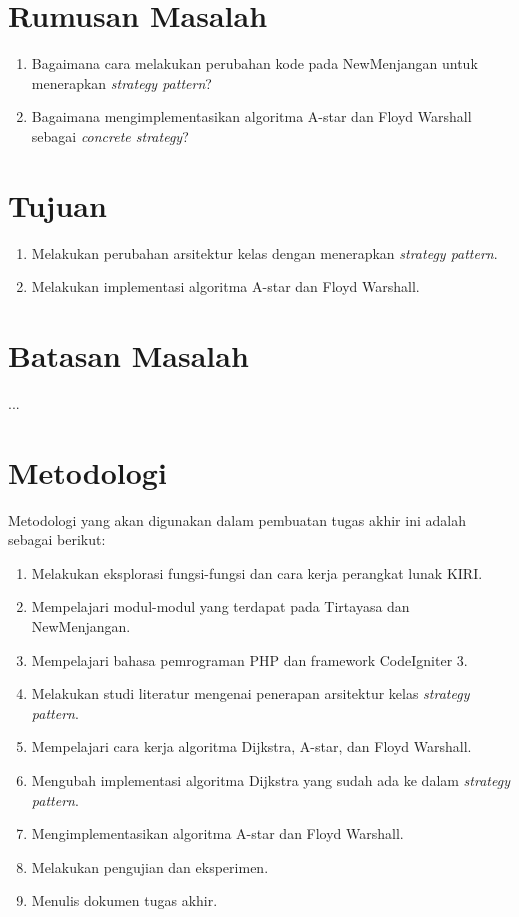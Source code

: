 \section{Rumusan Masalah}
\label{sec:rumusan}
	\begin{enumerate}
                \item Bagaimana cara melakukan perubahan kode pada NewMenjangan untuk menerapkan \textit{strategy pattern}?
                \item Bagaimana mengimplementasikan algoritma A-star dan Floyd Warshall sebagai \textit{concrete strategy}?
	\end{enumerate}
\newpage
\section{Tujuan}
\label{sec:tujuan}
	\begin{enumerate}
                \item Melakukan perubahan arsitektur kelas dengan menerapkan \textit{strategy pattern}.
                \item Melakukan implementasi algoritma A-star dan Floyd Warshall.
            \end{enumerate}

\section{Batasan Masalah}
\label{sec:batasan}
...

\section{Metodologi}
\label{sec:metlit}
Metodologi yang akan digunakan dalam pembuatan tugas akhir ini adalah sebagai berikut:
	\begin{enumerate}
		\item Melakukan eksplorasi fungsi-fungsi dan cara kerja perangkat lunak KIRI.
		\item Mempelajari modul-modul yang terdapat pada Tirtayasa dan NewMenjangan.
		\item Mempelajari bahasa pemrograman PHP dan framework CodeIgniter 3.
		\item Melakukan studi literatur mengenai penerapan arsitektur kelas \textit{strategy pattern}.
    		\item Mempelajari cara kerja algoritma Dijkstra, A-star, dan Floyd Warshall.
    		\item Mengubah implementasi algoritma Dijkstra yang sudah ada ke dalam \textit{strategy pattern}.
    		\item Mengimplementasikan algoritma A-star dan Floyd Warshall.
    		\item Melakukan pengujian dan eksperimen.
    		\item Menulis dokumen tugas akhir.
	\end{enumerate}

